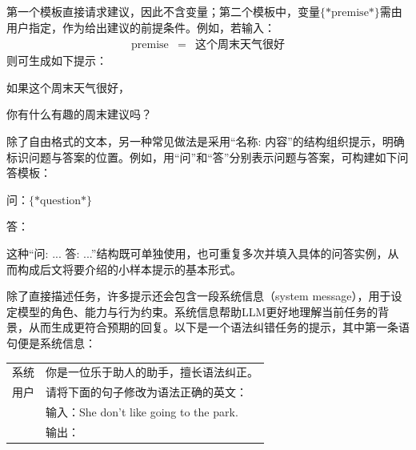 第一个模板直接请求建议，因此不含变量；第二个模板中，变量$\{*\mathrm{premise}*\}$需由用户指定，作为给出建议的前提条件。例如，若输入：
\begin{eqnarray}
\mathrm{premise} & = & \text{这个周末天气很好} \nonumber
\end{eqnarray}
则可生成如下提示：

\vspace{0.5em}
\begin{tcolorbox}

\hspace{2em} 如果这个周末天气很好，

\hspace{2em} 你有什么有趣的周末建议吗？

\hspace{2em} \underline{\hspace{2em}}
\end{tcolorbox}
\vspace{0.5em}

除了自由格式的文本，另一种常见做法是采用“名称: 内容”的结构组织提示，明确标识问题与答案的位置。例如，用“问”和“答”分别表示问题与答案，可构建如下问答模板：

\vspace{0.5em}
\begin{tcolorbox}

\hspace{2em} 问：$\{*\mathrm{question}*\}$

\hspace{2em} 答：\underline{\hspace{2em}}

\end{tcolorbox}
\vspace{0.5em}

这种“问: ... 答: ...”结构既可单独使用，也可重复多次并填入具体的问答实例，从而构成后文将要介绍的小样本提示的基本形式。

除了直接描述任务，许多提示还会包含一段系统信息（system message），用于设定模型的角色、能力与行为约束。系统信息帮助LLM更好地理解当前任务的背景，从而生成更符合预期的回复。以下是一个语法纠错任务的提示，其中第一条语句便是系统信息：

\vspace{0.5em}
\begin{tcolorbox}

\begingroup
\renewcommand{\arraystretch}{1.0}
\setlength{\tabcolsep}{6pt}
\begin{tabular}{r l}
{\color{gray} \footnotesize{系统}} & 你是一位乐于助人的助手，擅长语法纠正。 \\ [0.2cm]
{\color{gray} \footnotesize{用户}}  & 请将下面的句子修改为语法正确的英文： \\ [0.1cm]
 & 输入：She don't like going to the park. \\
 & 输出：\underline{\hspace{2em}}
\end{tabular}
\endgroup

\end{tcolorbox}
\vspace{0.5em}

